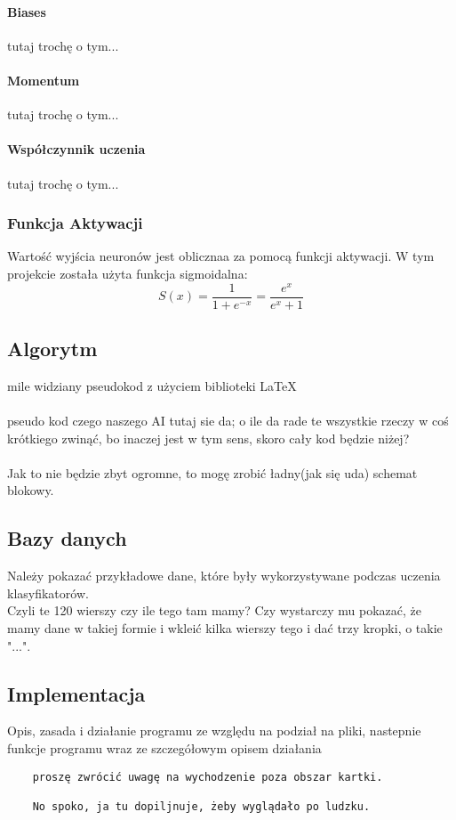 \documentclass[12pt,a4paper]{article}
\begin{document}
\paragraph*{Biases} tutaj trochę o tym...
\paragraph*{Momentum} tutaj trochę o tym...
\paragraph*{Współczynnik uczenia} tutaj trochę o tym...
\subsubsection*{Funkcja Aktywacji}
Wartość wyjścia neuronów jest oblicznaa za pomocą funkcji aktywacji. W tym projekcie została użyta funkcja sigmoidalna:
$$ S(x) = \frac{1}{1+e^{-x}} = \frac{e^x}{e^x+1} $$

	\subsection*{Algorytm}
	mile widziany pseudokod z użyciem biblioteki \LaTeX
	\\
	\\
	pseudo kod czego naszego AI tutaj sie da; o ile da rade te wszystkie rzeczy w coś krótkiego zwinąć, bo inaczej jest w tym sens, skoro cały kod będzie niżej?\\
	\\
	Jak to nie będzie zbyt ogromne, to mogę zrobić ładny(jak się uda) schemat blokowy.
	\subsection*{Bazy danych}
	Należy pokazać przykładowe dane, które były wykorzystywane podczas uczenia klasyfikatorów.
	\\
	Czyli te 120 wierszy czy ile tego tam mamy? Czy wystarczy mu pokazać, że mamy dane w takiej formie i wkleić kilka wierszy tego i dać trzy kropki, o takie "...".
	\subsection*{Implementacja}
	Opis, zasada i działanie programu ze względu na podział na pliki, nastepnie	funkcje programu wraz ze szczegółowym opisem działania
	\begin{verbatim}
	proszę zwrócić uwagę na wychodzenie poza obszar kartki.
	
	No spoko, ja tu dopiljnuje, żeby wyglądało po ludzku.
	\end{verbatim}
\end{document}
